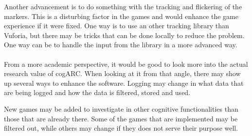 Another advancement is to do something with the tracking and flickering of the 
markers. This is a disturbing factor in the games and would enhance the game
experience if it were fixed. One way is to use an other tracking library than
Vuforia, but there may be tricks that can be done locally to reduce the 
problem. One way can be to handle the input from the library in a more advanced
way.

\paragraph{}

From a more academic perspective, it would be good to look more into the actual
research value of cogARC. When looking at it from that angle, there may show up
several ways to enhance the software. Logging may change in what data that are
being logged and how the data is filtered, stored and used.

New games may be added to investigate in other cognitive functionalities than 
those that are already there. Some of the games that are implemented may be
filtered out, while others may change if they does not serve their purpose well.
